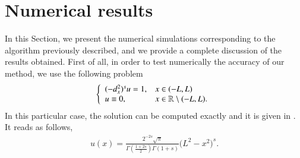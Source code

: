 \section{Numerical results} \label{res_numerical}
In this Section, we present the numerical simulations corresponding to the algorithm previously described, and we provide a complete discussion of the results obtained. 
%
First of all, in order to test numerically the accuracy of our method, we use the following problem 
%
\begin{align}\label{PE_real}
	\left\{\begin{array}{ll}
		(-d_x^2)^{s}u = 1, & x\in(-L,L)
		\\
		u\equiv 0, & x\in\mathbb{R}\setminus(-L,L).
	\end{array}\right.
\end{align}
%
In this particular case, the solution can be computed exactly and it is given in \cite{getoor1961first}. It reads as follows, 
\begin{align}\label{real_sol}
	u(x)=\frac{2^{-2s}\sqrt{\pi}}{\Gamma\left(\frac{1+2s}{2}\right)\Gamma(1+s)}\Big(L^2-x^2\Big)^s.
\end{align}


